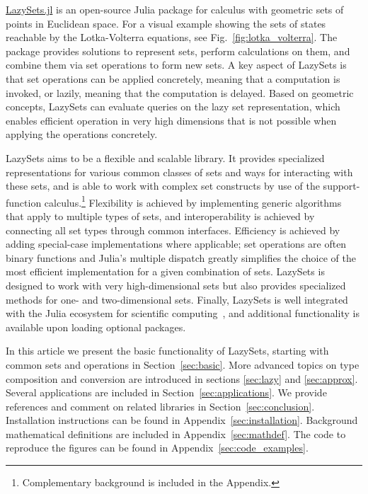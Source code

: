 \href{https://github.com/JuliaReach/LazySets.jl}{LazySets.jl} is an open-source Julia package for calculus with geometric sets of points in Euclidean space. For a visual example showing the sets of states reachable by the Lotka-Volterra equations, see Fig.~\ref{fig:lotka_volterra}.
%
The package provides solutions to represent sets, perform calculations on them, and combine them via set operations to form new sets.
%
A key aspect of LazySets is that set operations can be applied concretely, meaning that a computation is invoked, or lazily, meaning that the computation is delayed.
%
Based on geometric concepts, LazySets can evaluate queries on the lazy set representation, which enables efficient operation in very high dimensions that is not possible when applying the operations concretely.

\smallskip

LazySets aims to be a flexible and scalable library.
%
It provides specialized representations for various common classes of sets and ways for interacting with these sets, and is able to work with complex set constructs by use of the support-function calculus.\footnote{Complementary background is included in the Appendix.}
%
Flexibility is achieved by implementing generic algorithms that apply to multiple types of sets, and interoperability is achieved by connecting all set types through common interfaces.
%
Efficiency is achieved by adding special-case implementations where applicable; set operations are often binary functions and Julia's multiple dispatch greatly simplifies the choice of the most efficient implementation for a given combination of sets.
%
LazySets is designed to work with very high-dimensional sets but also provides specialized methods for one- and two-dimensional sets.
%
Finally, LazySets is well integrated with the Julia ecosystem for scientific computing~\cite{bezanson2017julia}, and additional functionality is available upon loading optional packages.
%

\smallskip

In this article we present the basic functionality of LazySets, starting with common sets and operations in Section~\ref{sec:basic}.
%
More advanced topics on type composition and conversion are introduced in sections \ref{sec:lazy} and \ref{sec:approx}.
%
Several applications are included in Section~\ref{sec:applications}.
%
We provide references and comment on related libraries in Section~\ref{sec:conclusion}.
%
Installation instructions can be found in Appendix~\ref{sec:installation}.
%
Background mathematical definitions are included in Appendix~\ref{sec:mathdef}.
%
The code to reproduce the figures can be found in Appendix~\ref{sec:code_examples}.

